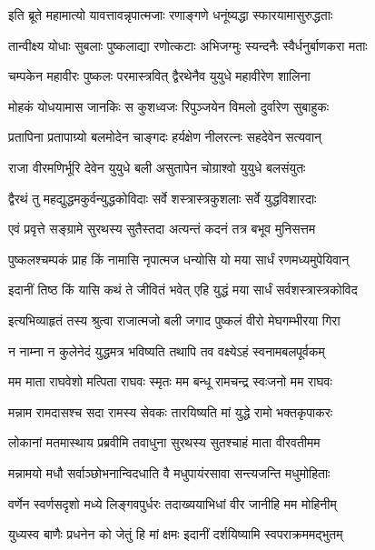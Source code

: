 \twolineshloka
{इति ब्रूते महामात्यो यावत्तावन्नृपात्मजाः}
{रणाङ्गणे धनूंष्यद्धा स्फारयामासुरुद्धताः}%

\twolineshloka
{तान्वीक्ष्य योधाः सुबलाः पुष्कलाद्या रणोत्कटाः}
{अभिजग्मुः स्यन्दनैः स्वैर्धनुर्बाणकरा मताः}%

\twolineshloka
{चम्पकेन महावीरः पुष्कलः परमास्त्रवित्}
{द्वैरथेनैव युयुधे महावीरेण शालिना}%

\twolineshloka
{मोहकं योधयामास जानकिः स कुशध्वजः}
{रिपुञ्जयेन विमलो दुर्वारेण सुबाहुकः}%

\twolineshloka
{प्रतापिना प्रतापाग्र्यो बलमोदेन चाङ्गदः}
{हर्यक्षेण नीलरत्नः सहदेवेन सत्यवान्}%

\twolineshloka
{राजा वीरमणिर्भूरि देवेन युयुधे बली}
{असुतापेन चोग्राश्वो युयुधे बलसंयुतः}%

\twolineshloka
{द्वैरथं तु महद्युद्धमकुर्वन्युद्धकोविदाः}
{सर्वे शस्त्रास्त्रकुशलाः सर्वे युद्धविशारदाः}%

\twolineshloka
{एवं प्रवृत्ते सङ्ग्रामे सुरथस्य सुतैस्तदा}
{अत्यन्तं कदनं तत्र बभूव मुनिसत्तम}%

\twolineshloka
{पुष्कलश्चम्पकं प्राह किं नामासि नृपात्मज}
{धन्योसि यो मया सार्धं रणमध्यमुपेयिवान्}%

\twolineshloka
{इदानीं तिष्ठ किं यासि कथं ते जीवितं भवेत्}
{एहि युद्धं मया सार्धं सर्वशस्त्रास्त्रकोविद}%

\twolineshloka
{इत्यभिव्याहृतं तस्य श्रुत्वा राजात्मजो बली}
{जगाद पुष्कलं वीरो मेघगम्भीरया गिरा}%


\twolineshloka
{न नाम्ना न कुलेनेदं युद्धमत्र भविष्यति}
{तथापि तव वक्ष्येऽहं स्वनामबलपूर्वकम्}%

\twolineshloka
{मम माता राघवेशो मत्पिता राघवः स्मृतः}
{मम बन्धू रामचन्द्र स्वःजनो मम राघवः}%

\twolineshloka
{मन्नाम रामदासश्च सदा रामस्य सेवकः}
{तारयिष्यति मां युद्धे रामो भक्तकृपाकरः}%

\twolineshloka
{लोकानां मतमास्थाय प्रब्रवीमि तवाधुना}
{सुरथस्य सुतश्चाहं माता वीरवतीमम}%

\twolineshloka
{मन्नामयो मधौ सर्वाञ्छोभनान्विदधाति वै}
{मधुपायंरसावा सन्त्यजन्ति मधुमोहिताः}%

\twolineshloka
{वर्णेन स्वर्णसदृशो मध्ये लिङ्गवपुर्धरः}
{तदाख्ययाभिधां वीर जानीहि मम मोहिनीम्}%

\twolineshloka
{युध्यस्व बाणैः प्रधनेन को जेतुं हि मां क्षमः}
{इदानीं दर्शयिष्यामि स्वपराक्रममद्भुतम्}%

